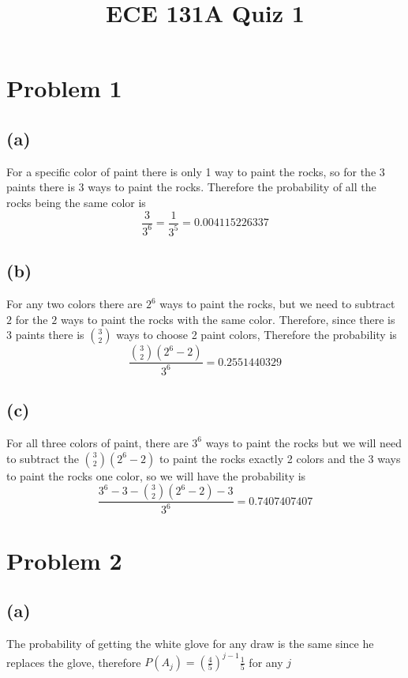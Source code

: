 
\title{ECE 131A Quiz 1}

\maketitle
\section*{Problem 1}
\subsection*{(a)}
For a specific color of paint there is only 1 way to paint the rocks, so for the 3 paints there is 
3 ways to paint the rocks. Therefore the probability of all the rocks being the same color is 
$$\frac{3}{3^6}=\frac{1}{3^5}=\boxed{0.004115226337}$$
\subsection*{(b)}
For any two colors there are $2^6$ ways to paint the rocks, but we need
to subtract $2$ for the $2$ ways to paint the rocks with the same color. 
Therefore, since there is 3 paints there is $3\choose 2$ ways to choose 2 paint
colors, Therefore the probability is
$$\frac{{3\choose 2}(2^6-2)}{3^6}=\boxed{0.2551440329}$$ 
\subsection*{(c)}
For all three colors of paint, there are $3^6$ ways to paint the rocks
but we will need to subtract the ${3\choose 2}(2^6-2)$ to 
paint the rocks exactly 2 colors and the $3$ ways to paint the rocks 
one color, so we will have the probability is 
$$\frac{3^6-3-{3\choose 2}(2^6-2)-3}{3^6}=\boxed{0.7407407407}$$

\section*{Problem 2}
\subsection*{(a)}
The probability of getting the white glove for any
draw is the same since he replaces the glove, 
therefore $P(A_j)=\boxed{\left(\frac{4}{5}\right)^{j-1}\frac{1}{5}}$ for any $j$
